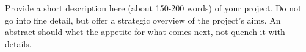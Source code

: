 \documentclass[]{./assets/tex/report-template}
\begin{document}
\maketitle

\tableofcontents

\abstract
Provide a short description here (about 150-200 words) of your project. Do not go into fine detail, but offer a strategic overview of the project’s aims. An abstract should whet the appetite for what comes next, not quench it with details.





















\printbibliography

\end{document}

